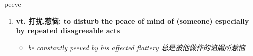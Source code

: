 
\begin{frame}
{\huge peeve}
\begin{center}
\begin{enumerate}\Large
  \item \textbf{vt. 打扰,惹恼: to disturb the peace of mind of (someone) especially by repeated disagreeable acts}
  \begin{itemize}
    \item \em{\Large{be constantly peeved by his affected flattery 总是被他做作的谄媚所惹恼}}
  \end{itemize}
\end{enumerate}
\end{center}
\end{frame}
